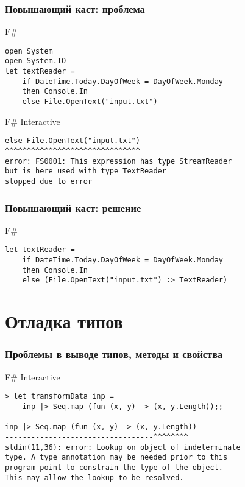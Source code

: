 \documentclass[xetex,mathserif,serif]{beamer}
\begin{document}
	\begin{frame}[fragile]
		\frametitle{Повышающий каст: проблема}
		\begin{exampleblock}{F\#}
			\begin{lstlisting}
open System
open System.IO
let textReader =
    if DateTime.Today.DayOfWeek = DayOfWeek.Monday
    then Console.In
    else File.OpenText("input.txt")
\end{lstlisting}
\end{exampleblock}

\begin{alertblock}{F\# Interactive}
\begin{lstlisting}[keywordstyle=\color{black}]
else File.OpenText("input.txt")
^^^^^^^^^^^^^^^^^^^^^^^^^^^^^^^
error: FS0001: This expression has type StreamReader 
but is here used with type TextReader 
stopped due to error
\end{lstlisting}
\end{alertblock}
\end{frame}

	\begin{frame}[fragile]
		\frametitle{Повышающий каст: решение}
		\begin{exampleblock}{F\#}
			\begin{lstlisting}
let textReader =
    if DateTime.Today.DayOfWeek = DayOfWeek.Monday
    then Console.In
    else (File.OpenText("input.txt") :> TextReader)
\end{lstlisting}
\end{exampleblock}
\end{frame}

	\section{Отладка типов}

	\begin{frame}[fragile]
		\frametitle{Проблемы в выводе типов, методы и свойства}
\begin{alertblock}{F\# Interactive}
\begin{lstlisting}[keywordstyle=\color{black}]
> let transformData inp =
    inp |> Seq.map (fun (x, y) -> (x, y.Length));;

inp |> Seq.map (fun (x, y) -> (x, y.Length))
----------------------------------^^^^^^^^
stdin(11,36): error: Lookup on object of indeterminate 
type. A type annotation may be needed prior to this 
program point to constrain the type of the object. 
This may allow the lookup to be resolved.
\end{lstlisting}
\end{alertblock}
\end{frame}
\end{document}
